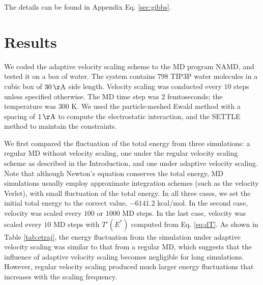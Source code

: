 \documentclass[reprint]{revtex4-1}
\begin{document}
The details can be found in Appendix Eq. \ref{sec:gibbs}.

%




\section{Results}



We coded the adaptive velocity scaling scheme to
the MD program NAMD\cite{NAMD},
and tested it on a box of water.
%
The system contains
$798$ TIP3P water molecules\cite{jorgensen1983}
in a cubic box of $30 \, \mathrm{\AA}$ side length.
%
Velocity scaling was conducted every $10$ steps
unless specified otherwise.
%
The MD time step was $2$ femtoseconds;
the temperature was $300$ K.
%
We used the particle-meshed Ewald method\cite{essmann1995}
with a spacing of $1 \, \mathrm{\AA}$
to compute the electrostatic interaction,
and the SETTLE method\cite{miyamoto1992}
to maintain the constraints.


We first compared the fluctuation of the total energy
from three simulations:
%
a regular MD without velocity scaling,
one under the regular velocity scaling scheme as described in the Introduction,
and one under adaptive velocity scaling.
%
Note that although Newton's equation conserves the total energy,
MD simulations usually employ approximate integration schemes
(such as the velocity Verlet),
with
small fluctuation of the total energy.
%
In all three cases,
we set the initial total energy to the correct value, $-6141.2$ kcal/mol.
%
In the second case,
velocity was scaled every $100$ or $1000$ MD steps.
%
In the last case,
velocity was scaled every $10$ MD steps with
$T'(E^*)$ computed from Eq. \eqref{eq:dT}.
%
As shown in Table \ref{tab:etraj},
the energy fluctuation from the simulation under adaptive velocity scaling
was similar to that from a regular MD,
which suggests that the influence of adaptive velocity scaling
becomes negligible for long simulations.
%
However, regular velocity scaling
produced much larger energy fluctuations
that increases with the scaling frequency.
\end{document}
